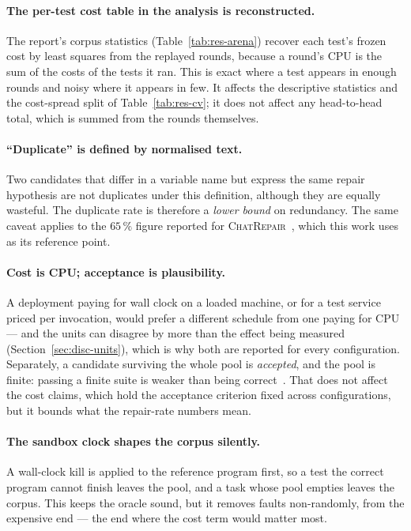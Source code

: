 \paragraph{The per-test cost table in the analysis is reconstructed.} The
report's corpus statistics (Table~\ref{tab:res-arena}) recover each test's
frozen cost by least squares from the replayed rounds, because a round's CPU is
the sum of the costs of the tests it ran. This is exact where a test appears in
enough rounds and noisy where it appears in few. It affects the descriptive
statistics and the cost-spread split of Table~\ref{tab:res-cv}; it does not
affect any head-to-head total, which is summed from the rounds themselves.

\paragraph{``Duplicate'' is defined by normalised text.} Two candidates that
differ in a variable name but express the same repair hypothesis are not
duplicates under this definition, although they are equally wasteful. The
duplicate rate is therefore a \emph{lower bound} on redundancy. The same caveat
applies to the $65\,\%$ figure reported for
\textsc{ChatRepair}~\citep{chen2025conversational}, which this work uses as its
reference point.

\paragraph{Cost is CPU; acceptance is plausibility.} A deployment paying for
wall clock on a loaded machine, or for a test service priced per invocation,
would prefer a different schedule from one paying for CPU --- and the units can
disagree by more than the effect being measured
(Section~\ref{sec:disc-units}), which is why both are reported for every
configuration. Separately, a candidate surviving the whole pool is
\emph{accepted}, and the pool is finite: passing a finite suite is weaker than
being correct~\citep{qi2015plausibility}. That does not affect the cost claims,
which hold the acceptance criterion fixed across configurations, but it bounds
what the repair-rate numbers mean.

\paragraph{The sandbox clock shapes the corpus silently.} A wall-clock kill is
applied to the reference program first, so a test the correct program cannot
finish leaves the pool, and a task whose pool empties leaves the corpus. This
keeps the oracle sound, but it removes faults non-randomly, from the expensive
end --- the end where the cost term would matter most.

